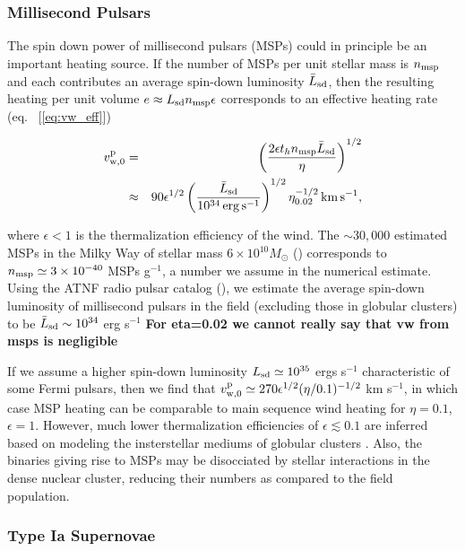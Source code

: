 \documentclass[usenatbib,fleqn]{mn2e}
\begin{document}
\subsubsection{Millisecond Pulsars} The spin down power of millisecond
pulsars (MSPs) could in principle be an important heating source.  If
the number of MSPs per unit stellar mass is $n_{\rm msp}$ and each
contributes an average spin-down luminosity $\bar{L}_{\rm sd}$, then the
resulting heating per unit volume $e \approx L_{\rm sd}n_{\rm
  msp}\epsilon$ corresponds to an effective heating rate (eq.~
[\ref{eq:vw_eff}])

\begin{align}
  v_{\rm w,0}^{\rm p} &=&\left({\frac{2\epsilon t_h n_{\rm msp} \bar{L}_{\rm sd}}{\eta}}\right)^{1/2} \nonumber \\
  &\approx& 90\epsilon^{1/2}\left(\frac{\bar{L}_{\rm
        sd}}{10^{34}\,{\rm erg\,s^{-1}}}\right)^{1/2}
  \eta_{0.02}^{-1/2}\,{\rm km\,s^{-1}},
  \end{align}

  where $\epsilon< 1$ is the thermalization efficiency of the wind.
  The $\sim 30,000$ estimated MSPs in the Milky Way of stellar mass
  $6\times 10^{10}M_{\odot}$ (\citealt{Lorimer13}) corresponds to
  $n_{\rm msp}\simeq3 \times 10^{-40} $ MSPs g$^{-1}$, a number we
  assume in the numerical estimate.  Using the ATNF radio pulsar
  catalog (\citealt{Manchester+05}), we estimate the average spin-down
  luminosity of millisecond pulsars in the field (excluding those in
  globular clusters) to be $\bar{L}_{\rm sd} \sim 10^{34}$ erg
  s$^{-1}$ {\bf For eta=0.02 we cannot really
    say that vw from msps is negligible}

  If we assume a higher spin-down luminosity $L_{\rm sd}\simeq
  10^{35}$ ergs s$^{-1}$ characteristic of some Fermi pulsars, then we
  find that $v_{\rm w,0}^{\rm p} \simeq 270\epsilon^{1/2}
  (\eta/0.1)^{-1/2}$ km s$^{-1}$, in which case MSP heating can be
  comparable to main sequence wind heating for $\eta = 0.1$, $\epsilon
  = 1$.  However, much lower thermalization efficiencies of $\epsilon
  \lesssim 0.1$ are inferred based on modeling the insterstellar
  mediums of globular clusters \citep{NaimanSoares-Furtado+:2013a}.
  Also, the binaries giving rise to MSPs may be disocciated by stellar
  interactions in the dense nuclear cluster, reducing their numbers as
  compared to the field population.
\subsubsection{Type Ia Supernovae} 
\end{document}
